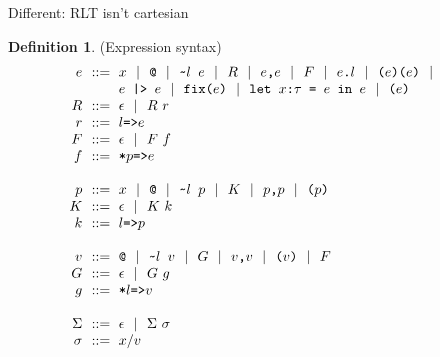 \documentclass[acmsmall]{acmart}
\theoremstyle{definition}
\newtheorem{definition}{Definition}[section]
\begin{document}
Different: RLT isn't cartesian



\begin{definition}(Expression syntax)
  \label{definition:expression_syntax}
  \[\begin{array}[t]{r@{}l}
    \nonterm{e} 
    & 
    \is 
    \begin{array}[t]{@{}l}
      \code{$x$} \sep 
      \code{@} \sep
      \code{\textasciitilde{}$l$ $e$} \sep 
      R \sep
      \code{$e$,$e$} \sep
      F \sep 
      \code{$e$.$l$} \sep
      \code{($e$)($e$)} \sep
      \\
      \code{$e$ |> $e$} \sep
      \code{fix($e$)} \sep
      \code{let $x$:$\tau$ = $e$ in $e$} \sep
      \code{($e$)}
    \end{array}
    \\
    \nonterm{R} & \is \epsilon \sep R\ r
    \\
    \nonterm{r} & \is \code{$l$=>$e$}
    \\
    \nonterm{F} & \is \epsilon \sep F\ f
    \\
    \nonterm{f} & \is \code{*$p$=>$e$}
    \\
    \\
    \nonterm{p} & \is 
      \code{$x$} \sep
      \code{@} \sep
      \code{\textasciitilde{}$l$ $p$} \sep
      K \sep
      \code{$p$,$p$} \sep
      \code{($p$)} 
    \\
    \nonterm{K} & \is \epsilon \sep K\ k
    \\
    \nonterm{k} & \is \code{$l$=>$p$}
    \\
    \\
    \nonterm{v} & \is 
      \code{@} \sep
      \code{\textasciitilde{}$l$ $v$} \sep
      G \sep
      \code{$v$,$v$} \sep
      \code{($v$)} \sep
      F 
    \\
    \nonterm{G} & \is \epsilon \sep G\ g
    \\
    \nonterm{g} & \is \code{*$l$=>$v$}
    \\
    \\
    \nonterm{\Sigma} & \is \epsilon \sep \Sigma\ \sigma
    \\
    \nonterm{\sigma} & \is x \slash v
  \end{array}\]
\end{definition}
\end{document}
